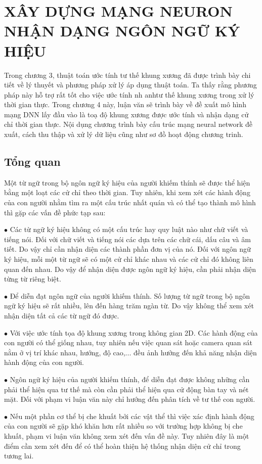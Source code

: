 \chapter{XÂY DỰNG MẠNG NEURON NHẬN DẠNG NGÔN NGỮ KÝ HIỆU}
\label{s:DNN}
Trong chương 3, thuật toán ước tính tư thế khung xương đã được trình bày chi tiết về lý thuyết và phương pháp xử lý áp dụng thuật toán. Ta thấy rằng phương pháp này hỗ trợ rất tốt cho việc ước tính nh anhtư thế khung xương trong xử lý thời gian thực. Trong chương 4 này, luận văn sẽ trình bày về đề xuất mô hình mạng DNN lấy đầu vào là toạ độ khung xương được ước tính và nhận dạng cử chỉ thời gian thực. Nội dụng chương trình bày cấu trúc mạng neural network đề xuất, cách thu thập và xử lý dữ liệu cũng như sơ đồ hoạt động chương trinh.
\section{Tổng quan}
Một từ ngữ trong bộ ngôn ngữ ký hiệu của người khiếm thính sẽ được thể hiện bằng một loạt các cử chỉ theo thời gian. Tuy nhiên, khi xem xét các hành động của con người nhằm tìm ra một cấu trúc nhất quán và có thể tạo thành mô hình thì gặp các vấn đề phức tạp sau:

$\bullet$ Các từ ngữ ký hiệu không có một cấu trúc hay quy luật nào như chữ viết và tiếng nói. Đối với chữ viết và tiếng nói các dựa trên các chữ cái, dấu câu và âm tiết. Do vậy chỉ cần nhận diện các thành phần đơn vị của nó. Đối với ngôn ngữ ký hiệu, mỗi một từ ngữ sẽ có một cử chỉ khác nhau và các cử chỉ đó không liên quan đến nhau. Do vậy để nhận diện được ngôn ngữ ký hiệu, cần phải nhận diện từng từ riêng biệt.

$\bullet$ Để diễn đạt ngôn ngữ của người khiếm thính. Số lượng từ ngữ trong bộ ngôn ngữ ký hiệu sẽ rất nhiều, lên đến hàng trăm ngàn từ. Do vậy không thể xem xét nhận diện tất cả các từ ngữ đó được.

$\bullet$ Với việc ước tính tọa độ khung xương trong không gian 2D. Các hành động của con người có thể giống nhau, tuy nhiên nếu việc quan sát hoặc camera quan sát nằm ở vị trí khác nhau, hướng, độ cao,... đều ảnh hưởng đến khả năng nhận diện hành động của con người.


$\bullet$ Ngôn ngữ ký hiệu của người khiếm thính, để diễn đạt được không những cần phải thể hiện qua tư thế mà còn cần phải thể hiện qua cử động bàn tay và nét mặt. Đối với phạm vi luận văn này chỉ hướng đến phân tích về tư thế con người.

$\bullet$ Nếu một phần cơ thể bị che khuất bởi các vật thể thì việc xác định hành động của con người sẽ gặp khó khăn hơn rất nhiều so với trường hợp không bị che khuất, phạm vi luận văn không xem xét đến vấn đề này. Tuy nhiên đây là một điểm cần xem xét đến để có thể hoàn thiện hệ thống nhận diện cử chỉ trong tương lai.

